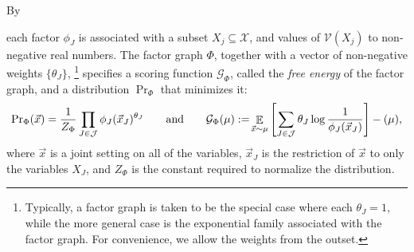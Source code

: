 \documentclass{article}
\theoremstyle{plain}
\theoremstyle{definition}
\theoremstyle{remark}
\DeclareMathOperator*{\Ex}{\mathbb{E}} %
\let\H\relax
\DeclareMathOperator{\H}{\mathrm{H}} %
\newcommand{\V}{\mathcal V}
\begin{document}
\begin{defn}
	By 
	
	 each factor $\phi_J$ is associated with a subset
	$X_j\subseteq \mathcal{X}$,
	and values of $\V(X_j)$ to non-negative real numbers.
	The factor graph $\Phi$,
	together with a vector of non-negative weights $\{ \theta_J \}$,%
	\footnote{
		Typically, a factor graph is taken to be the special case
		where each $\theta_J=1$,
		while the more general
		case is the exponential family associated with the factor graph.
		For convenience, we allow the weights from the outset.}
	specifies a scoring function $\mathcal G_\Phi$, called the 
	\emph{free energy} \cite{KF09} of the factor graph, and a distribution
	${\Pr}_{\Phi}$ that minimizes it: 
	\[ {\Pr}_{\Phi}(\vec x)
	= \frac{1}{Z_\Phi} \prod_{J \in \cal J} \phi_J(\vec
	x_J)^{\theta_J} 
	\qquad\text{and}\qquad
	\mathcal G_\Phi(\mu) := \!\Ex_{\vec x\sim\mu}\left[  \sum_{J \in
		\mathcal J} \theta_J \log\frac1{\phi_J(\vec	x_J)}\right] - \H(\mu)  , \]
	where $\vec{x}$ is a joint setting on all of the variables,
	$\vec{x}_J$ is the restriction of $\vec{x}$ to only the
	variables $X_J$, and $Z_\Phi$ is the constant required to
	normalize the distribution.  
\end{defn}
\end{document}
